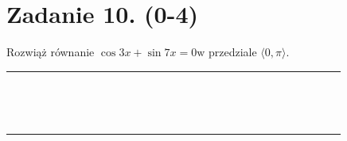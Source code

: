 \documentclass[10pt]{article}
\begin{document}
\section*{Zadanie 10. (0-4)}
Rozwiąż równanie \(\cos 3 x+\sin 7 x=0 \mathrm{w}\) przedziale \(\langle 0, \pi\rangle\).

\begin{center}
\begin{tabular}{|c|c|c|c|c|c|c|c|c|c|c|c|c|c|c|c|c|c|c|c|c|c|c|c|c|c|c|c|c|c|}
\hline
 &  &  &  &  &  &  &  &  &  &  &  &  &  &  &  &  &  &  &  &  &  &  &  &  &  &  &  &  &  \\
\hline
 &  &  &  &  &  &  &  &  &  &  &  &  &  &  &  &  &  &  &  &  &  &  &  &  &  &  &  &  &  \\
\hline
 &  &  &  &  &  &  &  &  &  &  &  &  &  &  &  &  &  &  &  &  &  &  &  &  &  &  &  &  &  \\
\hline
 &  &  &  &  &  &  &  &  &  &  &  &  &  &  &  &  &  &  &  &  &  &  &  &  &  &  &  &  &  \\
\hline
 &  &  &  &  &  &  &  &  &  &  &  &  &  &  &  &  &  &  &  &  &  &  &  &  &  &  &  &  &  \\
\hline
 &  &  &  &  &  &  &  &  &  &  &  &  &  &  &  &  &  &  &  &  &  &  &  &  &  &  &  &  &  \\
\hline
 &  &  &  &  &  &  &  &  &  &  &  &  &  &  &  &  &  &  &  &  &  &  &  &  &  &  &  &  &  \\
\hline
 &  &  &  &  &  &  &  &  &  &  &  &  &  &  &  &  &  &  &  &  &  &  &  &  &  &  &  &  &  \\
\hline
 &  &  &  &  &  &  &  &  &  &  &  &  &  &  &  &  &  &  &  &  &  &  &  &  &  &  &  &  &  \\
\hline
 &  &  &  &  &  &  &  &  &  &  &  &  &  &  &  &  &  &  &  &  &  &  &  &  &  &  &  &  &  \\
\hline
 &  &  &  &  &  &  &  &  &  &  &  &  &  &  &  &  &  &  &  &  &  &  &  &  &  &  &  &  &  \\
\hline
 &  &  &  &  &  &  &  &  &  &  &  &  &  &  &  &  &  &  &  &  &  &  &  &  &  &  &  &  &  \\
\hline
 &  &  &  &  &  &  &  &  &  &  &  &  &  &  &  &  &  &  &  &  &  &  &  &  &  &  &  &  &  \\
\hline
 &  &  &  &  &  &  &  &  &  &  &  &  &  &  &  &  &  &  &  &  &  &  &  &  &  &  &  &  &  \\
\hline
 &  &  &  &  &  &  &  &  &  &  &  &  &  &  &  &  &  &  &  &  &  &  &  &  &  &  &  &  &  \\
\hline
 &  &  &  &  &  &  &  &  &  &  &  &  &  &  &  &  &  &  &  &  &  &  &  &  &  &  &  &  &  \\
\hline
\end{tabular}
\end{center}
\end{document}
